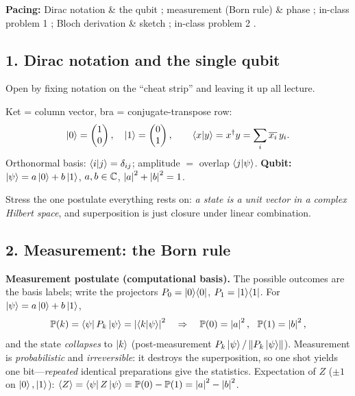 \documentclass[11pt]{article}
\begin{document}
\medskip
\noindent\textbf{Pacing:} Dirac notation \& the qubit ; measurement (Born rule) \& phase
; in-class problem 1 ; Bloch derivation \& sketch ;
in-class problem 2 .

\subsection*{1. Dirac notation and the single qubit }
Open by fixing notation on the ``cheat strip'' and leaving it up all lecture.

\begin{board}
Ket = column vector, bra = conjugate-transpose row:
\[
  \ket{0}=\begin{pmatrix}1\\0\end{pmatrix},\quad
  \ket{1}=\begin{pmatrix}0\\1\end{pmatrix},\qquad
  \braket{x|y}=x^{\dagger} y=\sum_i \overline{x_i}\,y_i .
\]
Orthonormal basis: $\braket{i|j}=\delta_{ij}$; amplitude $=$ overlap $\braket{j|\psi}$.
\textbf{Qubit:} $\ket{\psi}=a\ket0+b\ket1$, $a,b\in\mathbb{C}$, $\left\lvert a \right\rvert^2+\left\lvert b \right\rvert^2=1$.
\end{board}

Stress the one postulate everything rests on: \emph{a state is a unit vector in a
complex Hilbert space}, and superposition is just closure under linear combination.

\subsection*{2. Measurement: the Born rule }
\begin{board}
\textbf{Measurement postulate (computational basis).} The possible outcomes are the
basis labels; write the projectors $P_0=\ket{0}\!\bra{0}$, $P_1=\ket{1}\!\bra{1}$. For
$\ket{\psi}=a\ket0+b\ket1$,
\[
  \Prob(k)=\bra{\psi}P_k\ket{\psi}=\abs{\braket{k|\psi}}^2
  \quad\Rightarrow\quad \Prob(0)=\abs{a}^2,\ \ \Prob(1)=\abs{b}^2,
\]
and the state \emph{collapses} to $\ket{k}$ (post-measurement $P_k\ket{\psi}/\left\lVert P_k\ket{\psi} \right\rVert$).
Measurement is \emph{probabilistic} and \emph{irreversible}: it destroys the
superposition, so one shot yields one bit---\emph{repeated} identical preparations give
the statistics. Expectation of $Z$ ($\pm1$ on $\ket0,\ket1$):
$\langle Z\rangle=\bra{\psi}Z\ket{\psi}=\mathbb{P}(0)-\mathbb{P}(1)=\left\lvert a \right\rvert^2-\left\lvert b \right\rvert^2$.
\end{board}
\end{document}
